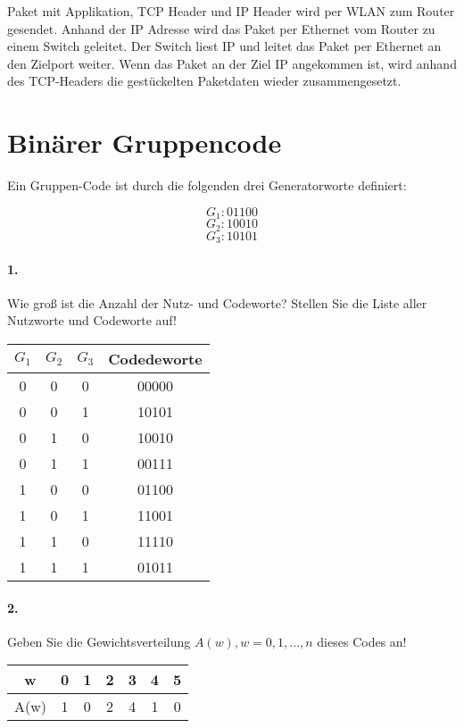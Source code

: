 \documentclass[paper=a4, fontsize=11pt]{scrartcl}
\numberwithin{equation}{section}
\numberwithin{figure}{section}
\numberwithin{table}{section}
\begin{document}
Paket mit Applikation, TCP Header und IP Header wird per WLAN zum Router gesendet. Anhand der IP Adresse wird das Paket per Ethernet vom Router zu einem Switch geleitet. Der Switch liest IP und leitet das Paket per Ethernet an den Zielport weiter. Wenn das Paket an der Ziel IP angekommen ist, wird anhand des TCP-Headers die gestückelten Paketdaten wieder zusammengesetzt.


\section{Binärer Gruppencode}
Ein Gruppen-Code ist durch die folgenden drei Generatorworte definiert:

$$G_{1}: 01100$$
$$G_{2}: 10010$$
$$G_{3}: 10101$$

\paragraph{1.}
Wie groß ist die Anzahl der Nutz- und Codeworte? Stellen Sie die Liste aller Nutzworte und Codeworte auf! \\

\begin{tabular}{|c|c|c||c|}
\hline
$G_{1}$ & $G_{2}$ & $G_{3}$ & Codedeworte \\
\hline
0 & 0 & 0 & 00000 \\
\hline
0 & 0 & 1 & 10101 \\
\hline
0 & 1 & 0 & 10010 \\
\hline
0 & 1 & 1 & 00111 \\
\hline
1 & 0 & 0 & 01100 \\
\hline
1 & 0 & 1 & 11001 \\
\hline
1 & 1 & 0 & 11110 \\
\hline
1 & 1 & 1 & 01011 \\
\hline
\end{tabular}

\paragraph{2.}
Geben Sie die Gewichtsverteilung $A(w), w=0,1, ...,n$ dieses Codes an! \\

\begin{tabular}{|c||c|c|c|c|c|c|}
\hline
w & 0 & 1 & 2 & 3 & 4 & 5 \\
\hline
A(w) & 1 & 0 & 2 & 4 & 1 & 0 \\
\hline
\end{tabular}
\end{document}
